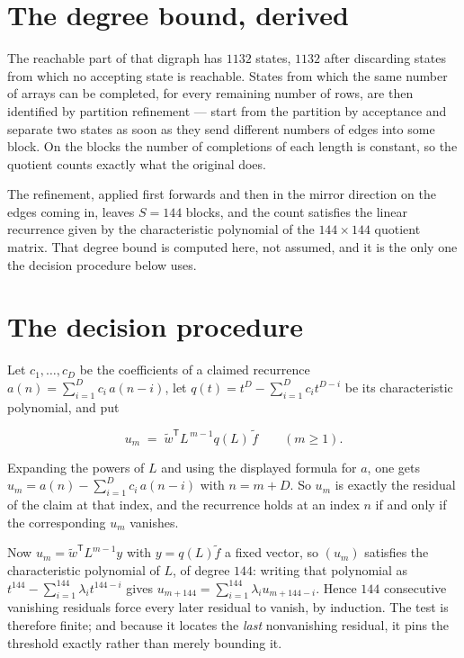 \documentclass[11pt]{article}
\theoremstyle{definition}
\begin{document}
\section{The degree bound, derived}

The reachable part of that digraph has $1132$ states, $1132$ after discarding states from which no accepting state is reachable. States from which the same number of arrays can be completed, for every remaining number of rows, are then identified by partition refinement --- start from the partition by acceptance and separate two states as soon as they send different numbers of edges into some block. On the blocks the number of completions of each length is constant, so the quotient counts exactly what the original does.

The refinement, applied first forwards and then in the mirror direction on the edges coming in, leaves $S = 144$ blocks, and the count satisfies the linear recurrence given by the characteristic polynomial of the $144 \times 144$ quotient matrix. That degree bound is computed here, not assumed, and it is the only one the decision procedure below uses.

\section{The decision procedure}

Let $c_1,\dots,c_D$ be the coefficients of a claimed recurrence $a(n) = \sum_{i=1}^{D} c_i\,a(n-i)$, let $q(t) = t^{D} - \sum_{i=1}^{D} c_i t^{D-i}$ be its characteristic polynomial, and put

\[u_m \;=\; \tilde w^{\mathsf T} L^{\,m-1} q(L)\,\tilde f \qquad (m \ge 1).\]

Expanding the powers of $L$ and using the displayed formula for $a$, one gets $u_m = a(n) - \sum_{i=1}^{D} c_i\,a(n-i)$ with $n = m + D$. So $u_m$ is exactly the residual of the claim at that index, and the recurrence holds at an index $n$ if and only if the corresponding $u_m$ vanishes.

Now $u_m = \tilde w^{\mathsf T} L^{m-1} y$ with $y = q(L)\tilde f$ a fixed vector, so $(u_m)$ satisfies the characteristic polynomial of $L$, of degree $144$: writing that polynomial as $t^{144} - \sum_{i=1}^{144} \lambda_i t^{144-i}$ gives $u_{m+144} = \sum_{i=1}^{144} \lambda_i u_{m+144-i}$. Hence $144$ consecutive vanishing residuals force every later residual to vanish, by induction. The test is therefore finite; and because it locates the {\itshape last} nonvanishing residual, it pins the threshold exactly rather than merely bounding it.
\end{document}
